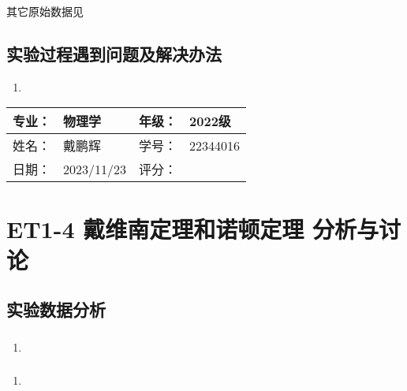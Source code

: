 \documentclass[dvipsnames, svgnames,a4paper,11pt]{article}
\begin{document}
	其它原始数据见%
	
	\subsection{实验过程遇到问题及解决办法}
	\begin{enumerate}
		\item 
	\end{enumerate}
	
	
	
	\clearpage
	
	\begin{table}
		\renewcommand\arraystretch{1.7}
		\begin{tabularx}{\textwidth}{|X|X|X|X|}
			\hline
			专业：& 物理学 &年级：& 2022级\\
			\hline
			姓名： & 戴鹏辉 & 学号：& 22344016\\
			\hline
			日期：& 2023/11/23 & 评分： &\\
			\hline
		\end{tabularx}
	\end{table}
	
	\section{ET1-4 戴维南定理和诺顿定理 \quad\heiti 分析与讨论}
	
	\subsection{实验数据分析}
	
	\subsubsection{}
	\begin{enumerate}
		\item 
	\end{enumerate}
	
	\subsubsection{}
	\begin{enumerate}
		\item 
	\end{enumerate}
	
	\subsubsection{}
	
\end{document}
